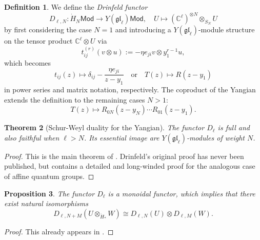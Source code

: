 \documentclass[11pt]{report}
\newtheorem{theorem}{Theorem}[section]
\newtheorem{prop}[theorem]{Proposition}
\theoremstyle{definition}
\newtheorem{definition}[theorem]{Definition}
\theoremstyle{remark}
\theoremstyle{remark}
\newcommand{\C}{\mathbb{C}}
\begin{document}
\begin{definition}
We define the \emph{Drinfeld functor}
\begin{equation*}
D_{\ell,N}: \dot H_N\mathsf{Mod} \to Y(\mathfrak{gl}_\ell)\mathsf{Mod}, \quad U \mapsto (\C^\ell)^{\otimes N} \otimes_{S_N} U
\end{equation*}
by first considering the case $N=1$ and introducing a $Y(\mathfrak{gl}_\ell)$-module structure on the tensor product $\C^\ell \otimes U$ via
\begin{equation*}
t_{ij}^{(r)}(v \otimes u) := -\eta e_{ji} v \otimes y_1^{r-1} u,
\end{equation*}
which becomes
\begin{equation*}
t_{ij}(z) \mapsto \delta_{ij} - \frac{\eta e_{ji}}{z-y_1} \quad \text{or} \quad T(z) \mapsto R(z-y_1)
\end{equation*}
in power series and matrix notation, respectively. The coproduct of the Yangian extends the definition to the remaining cases $N > 1$:
\begin{equation*}
T(z) \mapsto R_{0N}(z-y_N) \cdots R_{01}(z-y_1).
\end{equation*}
\end{definition}

\begin{theorem}[Schur-Weyl duality for the Yangian]
The functor $D_\ell$ is full and also faithful when $\ell > N$. Its essential image are $Y(\mathfrak{gl}_\ell)$-modules of weight $N$.
\end{theorem}

\begin{proof}
This is the main theorem of \cite{article:drinfeld:1986}. Drinfeld's original proof has never been published, but \cite{article:chari:1995} contains a detailed and long-winded proof for the analogous case of affine quantum groups.
\end{proof}

\begin{prop}
The functor $D_\ell$ is a monoidal functor, which implies that there exist natural isomorphisms
\begin{equation*}
D_{\ell,N+M}(U \otimes_{\dot H_*} W) \cong D_{\ell,N}(U) \otimes D_{\ell,M}(W).
\end{equation*}
\end{prop}

\begin{proof}
This already appears in \cite{article:drinfeld:1986}.
\end{proof}
\end{document}
